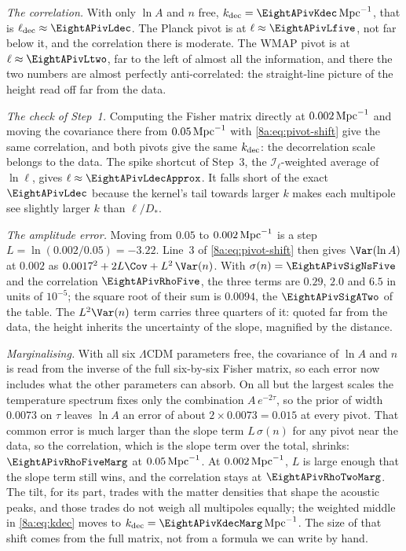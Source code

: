 \emph{The correlation.} With only $\ln A$ and $n$ free, $k_{\rm dec}=\EightAPivKdec\,{\rm Mpc}^{-1}$,
that is $\ell_{\rm dec}\approx\EightAPivLdec$. The Planck pivot is at $\ell\approx\EightAPivLfive$, not
far below it, and the correlation there is moderate. The WMAP pivot is at $\ell\approx\EightAPivLtwo$,
far to the left of almost all the information, and there the two numbers are almost perfectly
anti-correlated: the straight-line picture of the height read off far from the data.

\emph{The check of Step~1.} Computing the Fisher matrix directly at $0.002\,{\rm Mpc}^{-1}$ and moving
the covariance there from $0.05\,{\rm Mpc}^{-1}$ with \eqref{8a:eq:pivot-shift} give the same
correlation, and both pivots give the same $k_{\rm dec}$: the decorrelation scale belongs to the data.
The spike shortcut of Step~3, the $\mathcal I_\ell$-weighted average of $\ln\ell$, gives
$\ell\approx\EightAPivLdecApprox$. It falls short of the exact $\EightAPivLdec$ because the kernel's
tail towards larger $k$ makes each multipole see slightly larger $k$ than $\ell/D_*$.

\emph{The amplitude error.} Moving from $0.05$ to $0.002\,{\rm Mpc}^{-1}$ is a step
$L=\ln(0.002/0.05)=-3.22$. Line~3 of \eqref{8a:eq:pivot-shift} then gives
$\Var(\ln A)$ at $0.002$ as $0.0017^2+2L\Cov+L^2\,\Var(n)$. With
$\sigma(n)=\EightAPivSigNsFive$ and the correlation $\EightAPivRhoFive$, the three terms are
$0.29$, $2.0$ and $6.5$ in units of $10^{-5}$; the square root of their sum is $0.0094$, the
$\EightAPivSigATwo$ of the table. The $L^2\Var(n)$ term carries three quarters of it: quoted far
from the data, the height inherits the uncertainty of the slope, magnified by the distance.

\emph{Marginalising.} With all six $\Lambda$CDM parameters free, the covariance of $\ln A$ and $n$ is
read from the inverse of the full six-by-six Fisher matrix, so each error now includes what the
other parameters can absorb. On all but the largest scales the temperature spectrum fixes only the
combination $A\,e^{-2\tau}$, so the prior of width $0.0073$ on $\tau$ leaves $\ln A$ an error of about
$2\times0.0073=0.015$ at every pivot. That common error is much larger than the slope term
$L\,\sigma(n)$ for any pivot near the data, so the correlation, which is the slope term over the
total, shrinks: $\EightAPivRhoFiveMarg$ at $0.05\,{\rm Mpc}^{-1}$. At $0.002\,{\rm Mpc}^{-1}$, $L$ is
large enough that the slope term still wins, and the correlation stays at $\EightAPivRhoTwoMarg$. The
tilt, for its part, trades with the matter densities that shape the acoustic peaks, and those trades
do not weigh all multipoles equally; the weighted middle in \eqref{8a:eq:kdec} moves to
$k_{\rm dec}=\EightAPivKdecMarg\,{\rm Mpc}^{-1}$. The size of that shift comes from the full matrix,
not from a formula we can write by hand.

